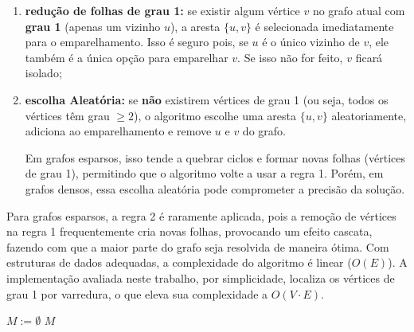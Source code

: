 \begin{enumerate}
    \item \textbf{redução de folhas de grau 1:} se existir algum vértice $v$ no grafo atual com \textbf{grau 1} (apenas um vizinho $u$), a aresta $\{u, v\}$ é selecionada imediatamente para o emparelhamento. Isso é seguro pois, se $u$ é o único vizinho de $v$, ele também é a única opção para emparelhar $v$. Se isso não for feito, $v$ ficará isolado;
    \item \textbf{escolha Aleatória:} se \textbf{não} existirem vértices de grau 1 (ou seja, todos os vértices têm grau $\ge 2$), o algoritmo escolhe uma aresta $\{u, v\}$ aleatoriamente, adiciona ao emparelhamento e remove $u$ e $v$ do grafo. 
    
    Em grafos esparsos, isso tende a quebrar ciclos e formar novas folhas (vértices de grau 1), permitindo que o algoritmo volte a usar a regra 1. Porém, em grafos densos, essa escolha aleatória pode comprometer a precisão da solução.
\end{enumerate}

Para grafos esparsos, a regra 2 é raramente aplicada, pois a remoção de vértices na regra 1 frequentemente cria novas folhas, provocando um efeito cascata, fazendo com que a maior parte do grafo seja resolvida de maneira ótima. Com estruturas de dados adequadas, a complexidade do algoritmo é linear ($O(E)$). A implementação avaliada neste trabalho, por simplicidade, localiza os vértices de grau 1 por varredura, o que eleva sua complexidade a $O(V \cdot E)$.

\begin{algorithm}[H]
    \DontPrintSemicolon
    \SetAlgoLined

    \caption{Algoritmo de Karp-Sipser \cite{karp-sipser}}
    \label{alg:karp_sipser}

    $M := \emptyset$\label{ks:init}\;
    \KwRet $M$\label{ks:ret}\;
\end{algorithm}

